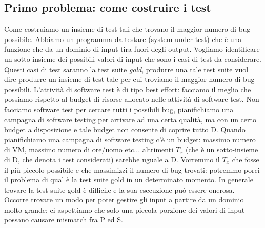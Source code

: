 \documentclass{article}
\begin{document}
\subsection{Primo problema: come costruire i test}
Come costruiamo un insieme di test tali che trovano il maggior numero di bug possibile. Abbiamo un programma da testare (system under test) che è una funzione che da un dominio di input tira fuori degli output. Vogliamo identificare un sotto-insieme dei possibili valori di input che sono i casi di test da considerare. Questi casi di test saranno la test suite \textit{gold}, produrre una tale test suite vuol dire produrre un insieme di test tale per cui troviamo il maggior numero di bug possibili. L'attività di software test è di tipo best effort: facciamo il meglio che possiamo rispetto al budget di risorse allocato nelle attività di software test. Non facciamo software test per cercare tutti i possibili bug, pianifichiamo una campagna di software testing per arrivare ad una certa qualità, ma con un certo budget a disposizione e tale budget non consente di coprire tutto D. Quando pianifichiamo una campagna di software testing c'è un budget: massimo numero di VM, massimo numero di ore/uomo etc... altrimenti $T_x$ (che è un sotto-insieme di D, che denota i test considerati) sarebbe uguale a D. Vorremmo il $T_x$ che fosse il più piccolo possibile e che massimizzi il numero di bug trovati: potremmo porci il problema di qual è la test suite gold in un determinato momento. In generale trovare la test suite gold è difficile e la sua esecuzione può essere onerosa.\\ Occorre trovare un modo per poter gestire gli input a partire da un dominio molto grande: ci aspettiamo che solo una piccola porzione dei valori di input possano causare mismatch fra P ed S.
\end{document}

